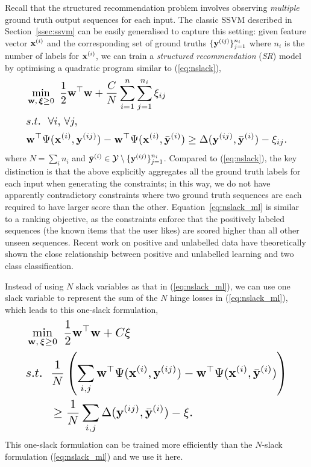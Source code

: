 Recall that the structured recommendation problem
involves observing \emph{multiple} ground truth output sequences for each input.
The classic SSVM described in Section~\ref{ssec:ssvm} can be easily generalised to capture this setting:
given feature vector $\mathbf{x}^{(i)}$ and the corresponding set of ground truths $\{\mathbf{y}^{(ij)}\}_{j=1}^{n_i}$
where $n_i$ is the number of labels for $\mathbf{x}^{(i)}$,
we can train a \emph{structured recommendation} (\emph{SR}) model by optimising a quadratic program similar to (\ref{eq:nslack}),
\begin{equation}
\label{eq:nslack_ml}
\resizebox{0.9\linewidth}{!}{$
\begin{aligned}
&\min_{\w, \, \bm{\xi} \ge 0} ~ \frac{1}{2} \w^\top \w + \frac{C}{N} \sum_{i=1}^n \sum_{j=1}^{n_i} \xi_{ij} \\
&s.t.~~ \forall i, \, \forall j, \\
& \w^\top \Psi(\x^{(i)}, \y^{(ij)}) - \w^\top \Psi(\x^{(i)}, \bar{\y}^{(i)}) \ge
  \Delta(\y^{(ij)}, \bar{\y}^{(i)}) - \xi_{ij}.
\end{aligned}
$}
\end{equation}
where $N = \sum_i n_i$ and $\bar{\mathbf{y}}^{(i)} \in \mathcal{Y} \setminus \{\mathbf{y}^{(ij)}\}_{j=1}^{n_i}$.
Compared to (\ref{eq:nslack}), the key distinction is that the above
explicitly aggregates all the ground truth labels for each input when generating the constraints;
in this way, we do not have apparently contradictory constraints where
two ground truth sequences are each required to have larger score than the other.
Equation~\ref{eq:nslack_ml} is similar to a ranking objective, as the constraints enforce
that the positively labeled sequences (the known items that the user likes) are scored
higher than all other unseen sequences. Recent work on positive and unlabelled data have
theoretically shown the close relationship between positive and unlabelled learning and two class
classification.

Instead of using $N$ slack variables as that in (\ref{eq:nslack_ml}),
we can use one slack variable to represent the sum of the $N$ hinge losses in (\ref{eq:nslack_ml}),
which leads to this one-slack formulation,
\begin{equation}
\label{eq:1slack_ml}
\resizebox{0.9\linewidth}{!}{$
\begin{aligned}
& \min_{\w, \, \xi \ge 0} ~\frac{1}{2} \w^\top \w + C \xi \\
& s.t.~~ \frac{1}{N} \left( \sum_{i,j} \w^\top \Psi(\x^{(i)}, \y^{(ij)}) - \w^\top \Psi(\x^{(i)}, \bar{\y}^{(i)}) \right) \\
& \hspace{2em} \ge \frac{1}{N} \sum_{i,j} \Delta(\y^{(ij)}, \bar{\y}^{(i)}) - \xi.
\end{aligned}
$}
\end{equation}
This one-slack formulation can be trained more efficiently than the $N$-slack formulation (\ref{eq:nslack_ml}) and we use it here.


